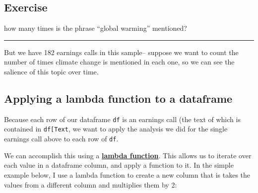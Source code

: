 \documentclass[
  letterpaper,
  DIV=11,
  numbers=noendperiod]{scrreprt}
\begin{document}
\hypertarget{exercise-9}{%
\subsection{Exercise}\label{exercise-9}}

how many times is the phrase ``global warming'' mentioned?

\begin{center}\rule{0.5\linewidth}{0.5pt}\end{center}

But we have 182 earnings calls in this sample-- suppose we want to count
the number of times climate change is mentioned in each one, so we can
see the salience of this topic over time.

\hypertarget{applying-a-lambda-function-to-a-dataframe}{%
\subsection{Applying a lambda function to a
dataframe}\label{applying-a-lambda-function-to-a-dataframe}}

Because each row of our dataframe \texttt{df} is an earnings call (the
text of which is contained in
\texttt{df{[}\textquotesingle{}Text\textquotesingle{}{]}}, we want to
apply the analysis we did for the single earnings call above to each row
of \texttt{df}.

We can accomplish this using a
\href{https://www.w3schools.com/python/python_lambda.asp}{\textbf{lambda
function}}. This allows us to iterate over each value in a dataframe
column, and apply a function to it. In the simple example below, I use a
lambda function to create a new column that is takes the values from a
different column and multiplies them by 2:
\end{document}
